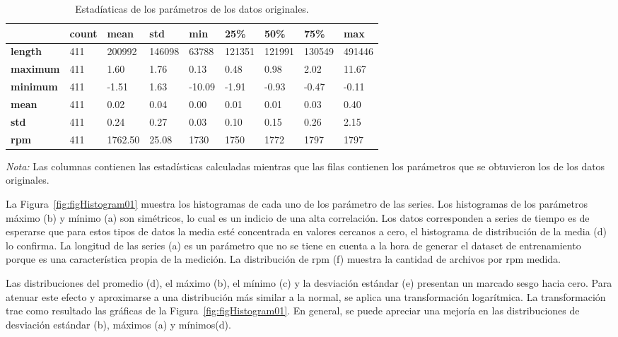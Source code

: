 \documentclass[11pt,a4paper,spanish]{book}
\numberwithin{equation}{chapter}
\numberwithin{figure}{chapter}
\begin{document}
\begin{table}[h]
\caption{Estadíaticas de los parámetros de los datos originales.}
\centering
\renewcommand{\arraystretch}{1.2}
\footnotesize
\begin{tabularx}{\textwidth}{|l|X|X|X|X|X|X|X|X|}
    \hline
    \textbf{ } & \textbf{count} & \textbf{mean} & \textbf{std} & \textbf{min} 
    & \textbf{25\%} & \textbf{50\%} & \textbf{75\%} & \textbf{max} \\
    \hline
    \textbf{length} & 411 & 200992 & 146098 & 63788 & 121351 & 121991 & 130549 & 491446 \\
    \hline
    \textbf{maximum} & 411 & 1.60 & 1.76 & 0.13 & 0.48 & 0.98 & 2.02 & 11.67 \\
    \hline
    \textbf{minimum} & 411 & -1.51 & 1.63 & -10.09 & -1.91 & -0.93 & -0.47 & -0.11 \\
    \hline
    \textbf{mean} & 411 & 0.02 & 0.04 & 0.00 & 0.01 & 0.01 & 0.03 & 0.40 \\
    \hline
    \textbf{std} & 411 & 0.24 & 0.27 & 0.03 & 0.10 & 0.15 & 0.26 & 2.15 \\
    \hline
    \textbf{rpm} & 411 & 1762.50 & 25.08 & 1730 & 1750 & 1772 & 1797 & 1797 \\
    \hline
\end{tabularx}
\label{tab:stats}
\vspace{2mm}
\parbox{\textwidth}{\footnotesize \textit{Nota:} Las columnas contienen las estadísticas calculadas 
mientras que las filas contienen los parámetros que se obtuvieron los de los datos originales.}
\end{table}


La Figura~\ref{fig:figHistogram01} muestra los histogramas de cada uno de los parámetro 
de las series. Los histogramas de los parámetros máximo (b) y mínimo (a) son simétricos, 
lo cual es un indicio de una alta correlación. Los datos corresponden a series de 
tiempo es de esperarse que para estos tipos de datos la media esté concentrada en 
valores cercanos a cero, el histograma de distribución de la media (d) lo confirma. 
La longitud de las series (a) es un parámetro que no se tiene en cuenta a la hora de 
generar el dataset de entrenamiento porque es una característica propia de la medición. 
La distribución de rpm (f) muestra la cantidad de archivos por rpm medida.    


Las distribuciones del promedio (d), el máximo (b), el mínimo (c) y la desviación 
estándar (e) presentan un marcado sesgo hacia cero. Para atenuar este efecto y 
aproximarse a una distribución más similar a la normal, se aplica una transformación 
logarítmica. La transformación trae como resultado las gráficas de la 
Figura~\ref{fig:figHistogram01}. En general, se puede apreciar una mejoría en las 
distribuciones de desviación estándar (b), máximos (a) y mínimos(d). 
\end{document}
